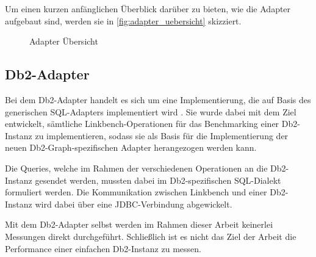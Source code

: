 Um einen kurzen anfänglichen Überblick darüber zu bieten, wie die Adapter aufgebaut sind, werden sie in \autoref{fig:adapter_uebersicht} skizziert.

\begin{figure}[!ht]
    \centering
	\usetikzlibrary{arrows, arrows.meta}
    \caption{Adapter Übersicht}
    \label{fig:adapter_uebersicht}
\end{figure}


\subsection{Db2-Adapter}
\label{implementierung:adapter:db2}
Bei dem Db2-Adapter handelt es sich um eine Implementierung, die auf Basis des generischen SQL-Adapters implementiert wird \cite{mc_linkbench_github}. Sie wurde dabei mit dem Ziel entwickelt, sämtliche Linkbench-Operationen für das Benchmarking einer Db2-Instanz zu implementieren, sodass sie als Basis für die Implementierung der neuen Db2-Graph-spezifischen Adapter herangezogen werden kann.

Die Queries, welche im Rahmen der verschiedenen Operationen an die Db2-Instanz gesendet werden, mussten dabei im Db2-spezifischen SQL-Dialekt formuliert werden. Die Kommunikation zwischen Linkbench und einer Db2-Instanz wird dabei über eine JDBC-Verbindung abgewickelt. 

Mit dem Db2-Adapter selbst werden im Rahmen dieser Arbeit keinerlei Messungen direkt durchgeführt. Schließlich ist es nicht das Ziel der Arbeit die Performance einer einfachen Db2-Instanz zu messen. 

